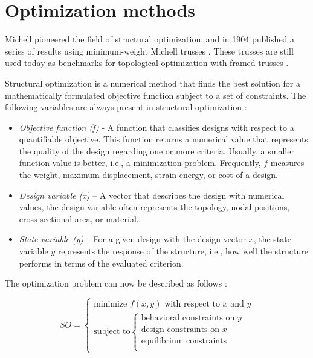 \section{Optimization methods}
Michell pioneered the field of structural optimization, and in 1904 published a series of results using minimum-weight Michell trusses \cite{Michell1904}. These trusses are still used today as benchmarks for topological optimization with framed trusses \cite{Clune2013}. 

Structural optimization is a numerical method that finds the best solution for a mathematically formulated objective function subject to a set of constraints. The following variables are always present in structural optimization \cite{christensen2008introduction}:

\begin{itemize} 
\item \textit{Objective function (f) }- A function that classifies designs with respect to a quantifiable objective. This function returns a numerical value that represents the quality of the design regarding one or more criteria. Usually, a smaller function value is better, i.e., a minimization problem. Frequently, $f$ measures the weight, maximum displacement, strain energy, or cost of a design.
\item \textit{Design variable (x)} – A vector that describes the design with numerical values, the design variable often represents the topology, nodal positions, cross-sectional area, or material.
\item \textit{State variable (y)} – For a given design with the design vector $x$, the state variable $y$ represents the response of the structure, i.e., how well the structure performs in terms of the evaluated criterion.
\end{itemize} 

The optimization problem can now be described as follows \cite{christensen2008introduction}:

\begin{equation}
SO=\begin{cases}
    \textrm{minimize } f(x,y) \textrm{ with respect to } x \textrm{ and } y \\
    {\textrm{subject to} \begin{cases}
        \textrm{behavioral constraints on } y\\
        \textrm{design constraints on } x\\
	\textrm{equilibrium constraints} \\
    \end{cases}}
      \end{cases}
    \end{equation} 


